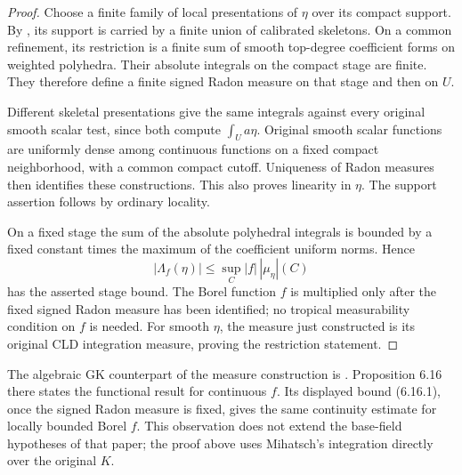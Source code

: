 \documentclass[11pt,a4paper]{article}
\numberwithin{equation}{section}
\theoremstyle{definition}
\theoremstyle{remark}
\begin{document}
\begin{proof}
Choose a finite family of local presentations of $\eta$ over its
compact support.  By \cite[Corollary 4.9 and Definition 4.10]{Mih24},
its support is carried by a finite union of calibrated skeletons.
On a common refinement, its restriction is a finite sum of smooth
top-degree coefficient forms on weighted polyhedra.  Their absolute
integrals on the compact stage are finite.  They therefore define a
finite signed Radon measure on that stage and then on $U$.

Different skeletal presentations give the same integrals against
every original smooth scalar test, since both compute
$\int_U a\eta$.  Original smooth scalar functions are uniformly
dense among continuous functions on a fixed compact neighborhood,
with a common compact cutoff.  Uniqueness of Radon measures then
identifies these constructions.  This also proves linearity in
$\eta$.  The support assertion follows by ordinary locality.

On a fixed stage the sum of the absolute polyhedral integrals is
bounded by a fixed constant times the maximum of the coefficient
uniform norms.  Hence
\[
 |\Lambda_f(\eta)|\leq\sup_C|f|\,|\mu_\eta|(C)
\]
has the asserted stage bound.  The Borel function $f$ is multiplied
only after the fixed signed Radon measure has been identified;
no tropical measurability condition on $f$ is needed.
For smooth $\eta$, the measure just constructed is its original
CLD integration measure, proving the restriction statement.
\end{proof}

The algebraic GK counterpart of the measure construction is
\cite[Corollary 6.15]{GK17}.  Proposition 6.16 there states the
functional result for continuous $f$.  Its displayed bound (6.16.1),
once the signed Radon measure is fixed, gives the same continuity
estimate for locally bounded Borel $f$.  This observation does not
extend the base-field hypotheses of that paper; the proof above
uses Mihatsch's integration directly over the original $K$.
\end{document}
